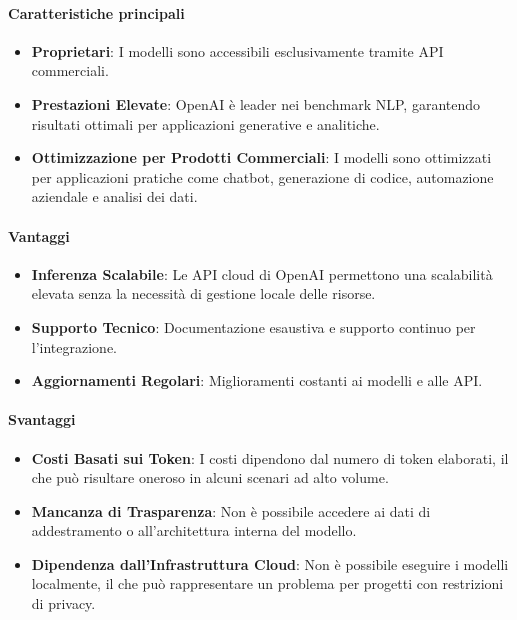 \documentclass{article}
\begin{document}
\paragraph*{Caratteristiche principali}
\begin{itemize}
    \item \textbf{Proprietari}: I modelli sono accessibili esclusivamente tramite API commerciali.
    \item \textbf{Prestazioni Elevate}: OpenAI è leader nei benchmark NLP, garantendo risultati ottimali per applicazioni generative e analitiche.
    \item \textbf{Ottimizzazione per Prodotti Commerciali}: I modelli sono ottimizzati per applicazioni pratiche come chatbot, generazione di codice, automazione aziendale e analisi dei dati.
\end{itemize}

\paragraph*{Vantaggi}
\begin{itemize}
    \item \textbf{Inferenza Scalabile}: Le API cloud di OpenAI permettono una scalabilità elevata senza la necessità di gestione locale delle risorse.
    \item \textbf{Supporto Tecnico}: Documentazione esaustiva e supporto continuo per l'integrazione.
    \item \textbf{Aggiornamenti Regolari}: Miglioramenti costanti ai modelli e alle API.
\end{itemize}

\paragraph*{Svantaggi}
\begin{itemize}
    \item \textbf{Costi Basati sui Token}: I costi dipendono dal numero di token elaborati, il che può risultare oneroso in alcuni scenari ad alto volume.
    \item \textbf{Mancanza di Trasparenza}: Non è possibile accedere ai dati di addestramento o all'architettura interna del modello.
    \item \textbf{Dipendenza dall'Infrastruttura Cloud}: Non è possibile eseguire i modelli localmente, il che può rappresentare un problema per progetti con restrizioni di privacy.
\end{itemize}
\end{document}
